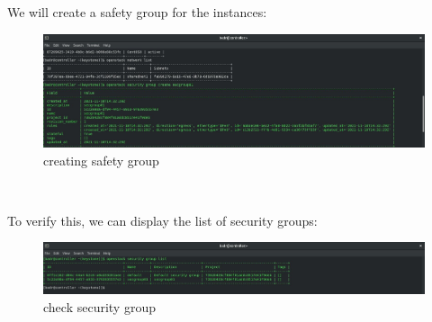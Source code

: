 \begin{spacing}{1.2}
\par We will create a safety group for the instances:
\\
\begin{figure}[!htb] 
\begin{center} 
\includegraphics[width=1\linewidth]{Cloud/Creating and Running Instances/creating safety group} 
\end{center} 
\caption{creating safety group} 
\end{figure} 
\FloatBarrier

\\\par To verify this, we can display the list of security groups: 
\\
\begin{figure}[!htb] 
\begin{center} 
\includegraphics[width=1\linewidth]{Cloud/Creating and Running Instances/check security group} 
\end{center} 
\caption{check security group} 
\end{figure} 
\FloatBarrier
\\


\end{spacing}

